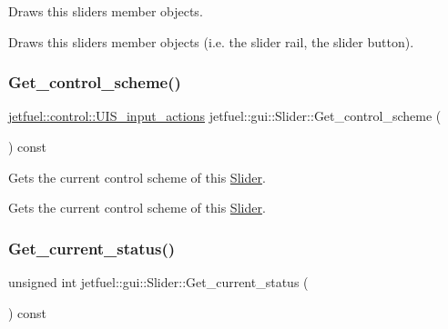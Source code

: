 Draws this slider\textquotesingle{}s member objects. 

Draws this slider\textquotesingle{}s member objects (i.\+e. the slider rail, the slider button). \mbox{\label{classjetfuel_1_1gui_1_1Slider_a65b6eea54c4b4b78d0522b9eda83db0b}} 
\subsubsection{\texorpdfstring{Get\+\_\+control\+\_\+scheme()}{Get\_control\_scheme()}}
{\footnotesize\ttfamily \hyperlink{structjetfuel_1_1control_1_1UIS__input__actions}{jetfuel\+::control\+::\+U\+I\+S\+\_\+input\+\_\+actions} jetfuel\+::gui\+::\+Slider\+::\+Get\+\_\+control\+\_\+scheme (\begin{DoxyParamCaption}{ }\end{DoxyParamCaption}) const\hspace{0.3cm}{\ttfamily [inline]}}



Gets the current control scheme of this \hyperlink{classjetfuel_1_1gui_1_1Slider}{Slider}. 

Gets the current control scheme of this \hyperlink{classjetfuel_1_1gui_1_1Slider}{Slider}. \mbox{\label{classjetfuel_1_1gui_1_1Slider_a62ef1133fbbea679b51d7ecf4ba4b6a8}} 
\subsubsection{\texorpdfstring{Get\+\_\+current\+\_\+status()}{Get\_current\_status()}}
{\footnotesize\ttfamily unsigned int jetfuel\+::gui\+::\+Slider\+::\+Get\+\_\+current\+\_\+status (\begin{DoxyParamCaption}{ }\end{DoxyParamCaption}) const\hspace{0.3cm}{\ttfamily [inline]}}



